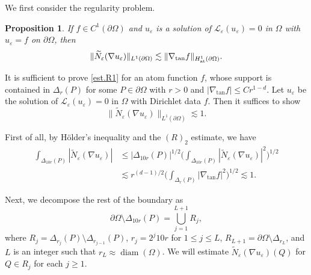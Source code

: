 \documentclass[reqno,12pt]{amsart} %
\newtheorem{proposition}[theorem]{Proposition}
\theoremstyle{definition}
\theoremstyle{remark}
\numberwithin{equation}{section}
\newcommand{\cL}{\mathcal{L}}
\newcommand{\e}{\varepsilon}
\DeclareMathOperator{\diam}{diam}
\begin{document}

We first consider the regularity problem.

\begin{proposition}\label{prop.R1}
    If $f\in C^1(\partial \Omega)$ and $u_\e$ is a solution of $\cL_\e(u_\e)=0$ in $\Omega$ with
    $u_\e=f$ on $\partial\Omega$, then
\begin{equation}\label{est.R1}
    \| \widetilde{N}_\e(\nabla u_\e) \|_{L^1(\partial \Omega)} \lesssim \| \nabla_{\tan} f \|_{H^1_{\rm at}(\partial \Omega)}.
\end{equation}
\end{proposition}

It is sufficient to prove \eqref{est.R1} for an atom function $f$, whose support is contained in $\Delta_r(P)$ for some $P\in \partial \Omega$ with $r>0$ and $|\nabla_{\tan} f| \le Cr^{1-d}$. Let $u_\e$ be the solution of $\cL_\e(u_\e)=0 $ in $\Omega$ with Dirichlet data $f$. Then it suffices to show
\begin{equation}\label{est.DeuL1<1}
    \| \widetilde{N}_\e(\nabla u_\e) \|_{L^1(\partial \Omega)} \lesssim 1.
\end{equation}

First of all, by H\"{o}lder's inequality and the $(R)_2$ estimate, we have
\begin{equation}\label{est.Delta10r}
\begin{aligned}
    \int_{\Delta_{10r}(P)} |\widetilde{N}_\e(\nabla u_\e)| & \le |\Delta_{10r}(P)|^{1/2}\bigg( \int_{\Delta_{10r}(P)} |\widetilde{N}_\e(\nabla u_\e)|^2 \bigg)^{1/2}  \\
    & \lesssim r^{(d-1)/2} \bigg( \int_{\Delta_r(P)} |\nabla_{\tan} f|^2 \bigg)^{1/2} \lesssim 1.
\end{aligned}
\end{equation}

Next, we decompose the rest of the boundary as
\begin{equation}\label{eq.Omega.decomp}
    \partial \Omega \setminus \Delta_{10r}(P) = \bigcup_{j=1}^{L+1} R_j,
\end{equation}
where $R_j = \Delta_{r_j}(P) \setminus \Delta_{r_{j-1}}(P)$, $r_j = 2^j 10 r$ for $1\le j \le L$, $R_{L+1} =\partial\Omega \setminus \Delta_{r_L}$,  and $L$ is an integer such that $r_L \approx \diam(\Omega)$. We will estimate $\widetilde{N}_\e(\nabla u_\e)(Q)$ for $Q \in R_j$ for each $j \ge 1$.
\end{document}
